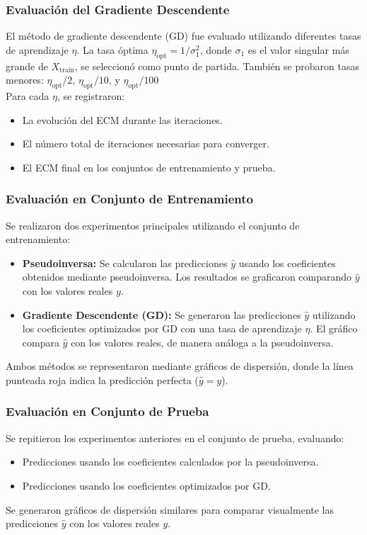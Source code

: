 \documentclass{tp02}
\begin{document}
\subsubsection{Evaluación del Gradiente Descendente}
El método de gradiente descendente (GD) fue evaluado utilizando 
diferentes tasas de aprendizaje $\eta$. La tasa óptima $\eta_{\text{opt}} 
= 1 / \sigma_1^2$, donde $\sigma_1$ es el valor singular más grande 
de $X_{\text{train}}$, se seleccionó como punto de partida. También se 
probaron tasas menores: $\eta_{\text{opt}} / 2$, $\eta_{\text{opt}} / 10$, 
y $\eta_{\text{opt}} / 100$\\

Para cada $\eta$, se registraron:
\begin{itemize}
    \item La evolución del ECM durante las iteraciones.
    \item El número total de iteraciones necesarias para converger.
    \item El ECM final en los conjuntos de entrenamiento y prueba.
\end{itemize}


\subsubsection{Evaluación en Conjunto de Entrenamiento}
Se realizaron dos experimentos principales utilizando el conjunto de 
entrenamiento:
\begin{itemize}
    \item \textbf{Pseudoinversa:} Se calcularon las predicciones 
    $\hat{y}$ usando los coeficientes obtenidos mediante 
    pseudoinversa. Los resultados se graficaron comparando 
    $\hat{y}$ con los valores reales $y$.
    \item \textbf{Gradiente Descendente (GD):} Se generaron las 
    predicciones $\hat{y}$ utilizando los coeficientes optimizados 
    por GD con una tasa de aprendizaje $\eta$. El gráfico compara 
    $\hat{y}$ con los valores reales, de manera análoga a la 
    pseudoinversa.
\end{itemize}
Ambos métodos se representaron mediante gráficos de dispersión, donde 
la línea punteada roja indica la predicción perfecta ($\hat{y} = y$).

\subsubsection{Evaluación en Conjunto de Prueba}
Se repitieron los experimentos anteriores en el conjunto de prueba, 
evaluando:
\begin{itemize}
    \item Predicciones usando los coeficientes calculados por la 
    pseudoinversa.
    \item Predicciones usando los coeficientes optimizados por GD.
\end{itemize}
Se generaron gráficos de dispersión similares para comparar 
visualmente las predicciones $\hat{y}$ con los valores reales $y$.
\end{document}
